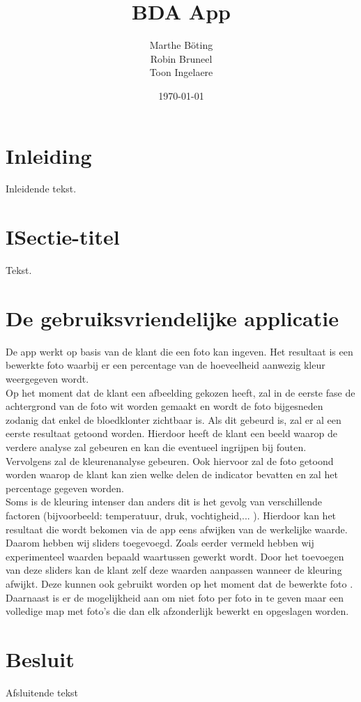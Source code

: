 \documentclass[a4paper,kulak]{kulakarticle}
\date{\today}
\title{BDA App}
\author{Marthe B\"{o}ting\\
	Robin Bruneel\\
	Toon Ingelaere}
\begin{document}
	
	
	\maketitle

\section*{Inleiding}

Inleidende tekst.

\tableofcontents

\section{ISectie-titel}


Tekst.

\section{De gebruiksvriendelijke applicatie}
De app werkt op basis van de klant die een foto kan ingeven. Het resultaat is een bewerkte foto waarbij er een percentage van de hoeveelheid aanwezig kleur weergegeven wordt.\\
Op het moment dat de klant een afbeelding gekozen heeft, zal  in de eerste fase de achtergrond van de foto wit worden gemaakt en wordt de foto bijgesneden zodanig dat enkel de bloedklonter zichtbaar is. Als dit gebeurd is, zal er al een eerste resultaat getoond worden. Hierdoor heeft de klant een beeld waarop de verdere analyse zal gebeuren en kan die eventueel ingrijpen bij fouten. \\
Vervolgens zal de kleurenanalyse gebeuren. Ook hiervoor zal de foto getoond worden waarop de klant kan zien welke delen de indicator bevatten en zal het percentage gegeven worden. \\
Soms is de kleuring intenser dan anders dit is het gevolg van verschillende factoren (bijvoorbeeld: temperatuur, druk, vochtigheid,... ). Hierdoor kan het resultaat die wordt bekomen via de app eens afwijken van de werkelijke waarde. Daarom hebben wij sliders toegevoegd. Zoals eerder vermeld hebben wij experimenteel waarden bepaald waartussen gewerkt wordt. Door het toevoegen van deze sliders kan de klant zelf deze waarden aanpassen wanneer de kleuring afwijkt. Deze kunnen ook gebruikt worden op het moment dat de bewerkte foto .
Daarnaast is er de mogelijkheid aan om niet foto per foto in te geven maar een volledige map met foto's die dan elk afzonderlijk bewerkt en opgeslagen worden.

\section*{Besluit}

Afsluitende tekst


\end{document}
